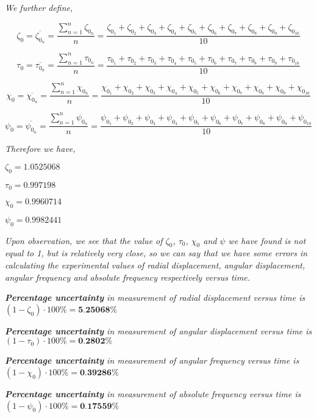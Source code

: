 \textit{We further define,} 

    $$\zeta_0 = \overline{\zeta_{0_n}} = \frac{\sum_{n=1}^{n}\zeta_{0_n}}{n} = \frac{\zeta_{0_1} + \zeta_{0_2} + \zeta_{0_3} + \zeta_{0_4} + \zeta_{0_5} + \zeta_{0_6} + \zeta_{0_7} + \zeta_{0_8} + \zeta_{0_9} + \zeta_{0_{10}}}{10}$$
    
    $$\tau_0 = \overline{\tau_{0_n}} = \frac{\sum_{n=1}^{n}\tau_{0_n}}{n} = \frac{\tau_{0_1} + \tau_{0_2} + \tau_{0_3} + \tau_{0_4} + \tau_{0_5} + \tau_{0_6} + \tau_{0_7} + \tau_{0_8} + \tau_{0_9} + \tau_{0_{10}}}{10}$$
    
    $$\chi_0 = \overline{\chi_{0_n}} = \frac{\sum_{n=1}^{n}\chi_{0_n}}{n} = \frac{\chi_{0_1} + \chi_{0_2} + \chi_{0_3} + \chi_{0_4} + \chi_{0_5} + \chi_{0_6} + \chi_{0_7} + \chi_{0_8} + \chi_{0_9} + \chi_{0_{10}}}{10}$$
    
    $$\psi_0 = \overline{\psi_{0_n}} = \frac{\sum_{n=1}^{n}\psi_{0_n}}{n} = \frac{\psi_{0_1} + \psi_{0_2} + \psi_{0_3} + \psi_{0_4} + \psi_{0_5} + \psi_{0_6} + \psi_{0_7} + \psi_{0_8} + \psi_{0_9} + \psi_{0_{10}}}{10}$$

\textit{Therefore we have,}

    $\zeta_0 = 1.0525068$
    
    $\tau_0 = 0.997198$
    
    $\chi_0 = 0.9960714$
    
    $\psi_0 = 0.9982441$

\textit{Upon observation, we see that the value of $\zeta_0$, $\tau_0$, $\chi_0$ and $\psi$ we have found is not equal to 1, but is relatively very close, so we can say that we have some errors in calculating the experimental values of radial displacement, angular displacement, angular frequency and absolute frequency respectively versus time.}
        
        \textit{\textbf{Percentage uncertainty} in measurement of radial displacement versus time is $(1-\zeta_0)\cdot{100\%}=\textbf{5.25068\%}$}
        
        \textit{\textbf{Percentage uncertainty} in measurement of angular displacement versus time is $(1-\tau_0)\cdot{100\%}=\textbf{0.2802\%}$}
        
        \textit{\textbf{Percentage uncertainty} in measurement of angular frequency versus time is $(1-\chi_0)\cdot{100\%}=\textbf{0.39286\%}$}
        
        \textit{\textbf{Percentage uncertainty} in measurement of absolute frequency versus time is $(1-\psi_0)\cdot{100\%}=\textbf{0.17559\%}$}
        


